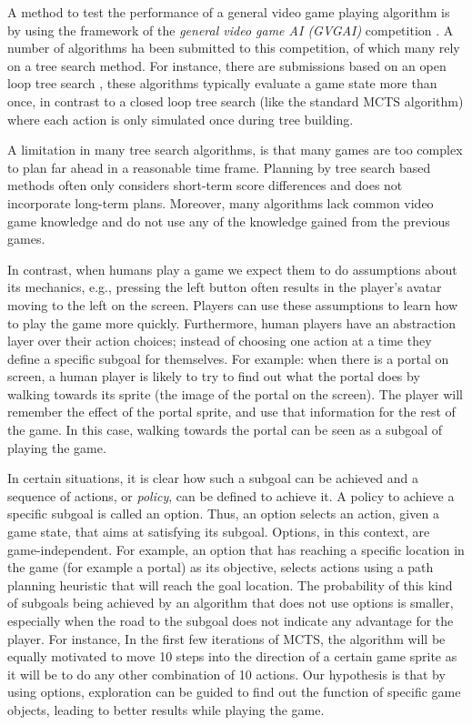 
A method to test the performance of a general video game playing algorithm is
by using the framework of the \emph{general video game AI (GVGAI)} competition
\cite{perez2014}.  A number of algorithms ha been submitted to this competition,
of which many rely on a tree search method. For instance, there are submissions
based on an open loop tree search \cite{perez2015open}, these algorithms
typically evaluate a game state more than once, in contrast to a closed loop
tree search (like the standard MCTS algorithm) where each action is only
simulated once during tree building. 

A limitation in many tree search algorithms, is that many games are too complex
to plan far ahead in a reasonable time frame. Planning by tree search based
methods often only considers short-term score differences and does not
incorporate long-term plans. Moreover, many algorithms lack common video game
knowledge and do not use any of the knowledge gained from the previous games.

In contrast, when humans play a game we expect them to do assumptions about its
mechanics, e.g., pressing the left button often results in the player's avatar
moving to the left on the screen. Players can use these assumptions to learn how
to play the game more quickly. Furthermore, human players have an abstraction
layer over their action choices; instead of choosing one action at a time they
define a specific subgoal for themselves.  For example: when there is a portal
on screen, a human player is likely to try to find out what the portal does by
walking towards its sprite (the image of the portal on the screen). The player
will remember the effect of the portal sprite, and use that information for the
rest of the game. In this case, walking towards the portal can be seen as a
subgoal of playing the game.

In certain situations, it is clear how such a subgoal can be achieved and a
sequence of actions, or \emph{policy}, can be defined to achieve it. A policy to
achieve a specific subgoal is called an option. Thus, an option selects an
action, given a game state, that aims at satisfying its subgoal. Options, in
this context, are game-independent. For example, an option that has reaching a
specific location in the game (for example a portal) as its objective, selects
actions using a path planning heuristic that will reach the goal location. 
The probability of this kind of subgoals being achieved by an algorithm that
does not use options is smaller, especially when the road to the subgoal does
not indicate any advantage for the player. For instance, In the first few
iterations of MCTS, the algorithm will be equally motivated to move 10 steps
into the direction of a certain game sprite as it will be to do any other
combination of 10 actions. Our hypothesis is that by using options, exploration
can be guided to find out the function of specific game objects, leading to
better results while playing the game.

